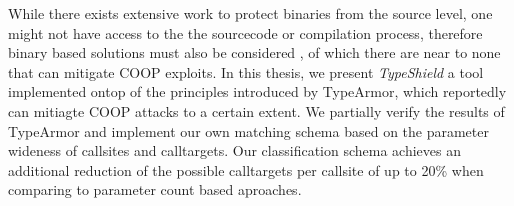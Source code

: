 While there exists extensive work to protect binaries from the source level, one might not have access to the the sourcecode or compilation process, therefore binary based solutions must also be considered , of which there are near to none that can mitigate COOP exploits. In this thesis, we present \textit{TypeShield} a tool implemented ontop of the principles introduced by TypeArmor, which reportedly can mitiagte COOP attacks to a certain extent. We partially verify the results of TypeArmor and implement our own matching schema based on the parameter wideness of callsites and calltargets. Our classification schema achieves an additional reduction of the possible calltargets per callsite of up to 20\% when comparing to parameter count based aproaches.
%
%
%
%
